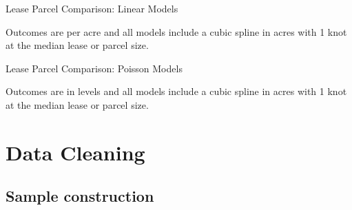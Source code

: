 \begin{appendices}
\begin{table}[H]
\begin{center}
\begin{threeparttable}
	\caption{Lease Parcel Comparison: Linear Models}
	\label{tab:lease_parcel_linear}
 	\small
   	            
    \footnotesize
    \begin{tablenotes}
    	\item Outcomes are per acre and all models include a cubic spline in acres with 1 knot at the median lease or parcel size.  
    \end{tablenotes}
\end{threeparttable}
\end{center}
\end{table}

\begin{table}[H]
\begin{center}
\begin{threeparttable}
	\caption{Lease Parcel Comparison: Poisson Models}
	\label{tab:lease_parcel_Poisson}
 	\small
   	            
    \footnotesize
    \begin{tablenotes}
    	\item Outcomes are in levels and all models include a cubic spline in acres with 1 knot at the median lease or parcel size.  
    \end{tablenotes}
\end{threeparttable}
\end{center}
\end{table}

\section{Data Cleaning \label{sec:DataCleaning}}

\subsection{Sample construction \label{sec:AppendixSampleConstruction}}


\end{appendices}
